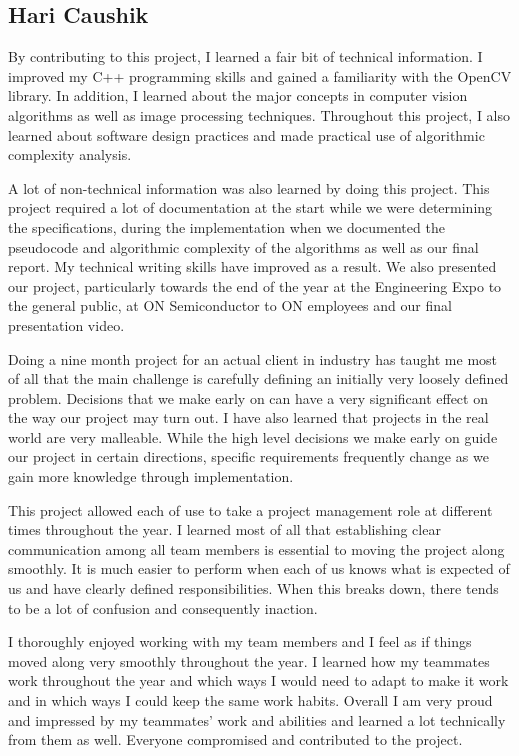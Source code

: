 \documentclass[letterpaper,10pt,titlepage]{article}
\begin{document}
\subsection*{Hari Caushik}
By contributing to this project, I learned a fair bit of technical information. 
I improved my C++ programming skills and gained a familiarity with the OpenCV
library. In addition, I learned about the major concepts in computer vision
algorithms as well as image processing techniques. Throughout this project, I
also learned about software design practices and made practical use of
algorithmic complexity analysis.

A lot of non-technical information was also learned by doing this project. This
project required a lot of documentation at the start while we were 
determining the specifications, during the implementation when we documented 
the pseudocode and algorithmic complexity of the algorithms as well as our 
final report. My technical writing skills have improved as a result. We also 
presented our project, particularly towards the end of the year at the 
Engineering Expo to the general public, at ON Semiconductor to ON employees and
our final presentation video. 

Doing a nine month project for an actual client in industry has taught me most
of all that the main challenge is carefully defining an initially very 
loosely defined problem. Decisions that we make early on can have a very 
significant effect on the way our project may turn out. I have also learned 
that projects in the real world are very malleable. While the high level 
decisions we make early on guide our project in certain directions, specific 
requirements frequently change as we gain more knowledge through 
implementation. 

This project allowed each of use to take a project management role at different
times throughout the year. I learned most of all that establishing clear 
communication among all team members is essential to moving the project along 
smoothly. It is much easier to perform when each of us knows what is expected
of us and have clearly defined responsibilities. When this breaks down, there 
tends to be a lot of confusion and consequently inaction. 

I thoroughly enjoyed working with my team members and I feel as if things 
moved along very smoothly throughout the year. I learned how my teammates work
throughout the year and which ways I would need to adapt to make it work and
in which ways I could keep the same work habits. Overall I am very proud and 
impressed by my teammates' work and abilities and learned a lot technically
from them as well. Everyone compromised and contributed to the project. 
\end{document}
